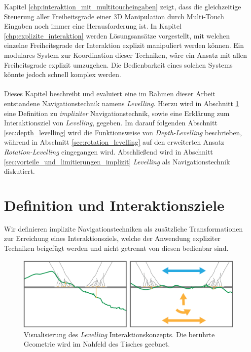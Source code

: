 Kapitel \ref{chp:interaktion_mit_multitoucheingaben} zeigt, dass die gleichzeitige Steuerung aller Freiheitsgrade einer 3D Manipulation durch Multi-Touch Eingaben noch immer eine Herausforderung ist. In Kapitel \ref{chp:explizite_interaktion} werden Lösungsansätze vorgestellt, mit welchen einzelne Freiheitsgrade der Interaktion explizit manipuliert werden können. Ein modulares System zur Koordination dieser Techniken, wäre ein Ansatz mit allen Freiheitsgrade explizit umzugehen. Die Bedienbarkeit eines solchen Systems könnte jedoch schnell komplex werden.
\\\\
Dieses Kapitel beschreibt und evaluiert eine im Rahmen dieser Arbeit entstandene Navigationstechnik namens \emph{Levelling}. Hierzu wird in Abschnitt \ref{sec:definition_levelling} eine Definition zu \emph{impliziter} Navigationstechnik, sowie eine Erklärung zum Interaktionsziel von \emph{Levelling}, gegeben. Im darauf folgenden Abschnitt \ref{sec:depth_levelling} wird die Funktionsweise von \emph{Depth-Levelling} beschrieben, während in Abschnitt \ref{sec:rotation_levelling} auf den erweiterten Ansatz \emph{Rotation-Levelling} eingegangen wird. Abschließend wird in Abschnitt \ref{sec:vorteile_und_limitierungen_implizit} \emph{Levelling} als Navigationstechnik diskutiert.


\section{Definition und Interaktionsziele}
\label{sec:definition_levelling}

Wir definieren implizite Navigationstechniken als zusätzliche Transformationen zur Erreichung eines Interaktionsziels, welche der Anwendung expliziter Techniken beigefügt werden und nicht getrennt von diesen bedienbar sind. 

\begin{figure}
	\begin{center}
		\includegraphics[width=12cm]{img/levelling_concept.pdf}
	\end{center}
	\caption{Visualisierung des \emph{Levelling} Interaktionskonzepts. Die berührte Geometrie wird im Nahfeld des Tisches geebnet.} 
	\label{fig:levelling_concept}
\end{figure}

